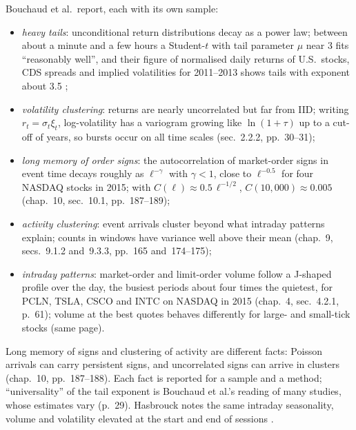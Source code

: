 \begin{qfevidence}\label{ev:high-frequency-stylised-facts}
 Bouchaud et al.\ report, each with its own sample:
\begin{itemize}
\item \emph{heavy tails}: unconditional return distributions decay as a power law; between about a minute and a few hours a Student-$t$ with tail parameter $\mu$ near 3 fits ``reasonably well'', and their figure of normalised daily returns of U.S.\ stocks, CDS spreads and implied volatilities for 2011--2013 shows tails with exponent about 3.5 \citep[chap.~2, sec.~2.2.1, pp.~28--30]{catalogue-0528};
\item \emph{volatility clustering}: returns are nearly uncorrelated but far from IID; writing $r_t=\sigma_t\xi_t$, log-volatility has a variogram growing like $\ln(1+\tau)$ up to a cut-off of years, so bursts occur on all time scales (sec.~2.2.2, pp.~30--31);
\item \emph{long memory of order signs}: the autocorrelation of market-order signs in event time decays roughly as $\ell^{-\gamma}$ with $\gamma<1$, close to $\ell^{-0.5}$ for four NASDAQ stocks in 2015; with $C(\ell)\approx0.5\,\ell^{-1/2}$, $C(10{,}000)\approx0.005$ (chap.~10, sec.~10.1, pp.~187--189);
\item \emph{activity clustering}: event arrivals cluster beyond what intraday patterns explain; counts in windows have variance well above their mean (chap.~9, secs.~9.1.2 and~9.3.3, pp.~165 and~174--175);
\item \emph{intraday patterns}: market-order and limit-order volume follow a J-shaped profile over the day, the busiest periods about four times the quietest, for PCLN, TSLA, CSCO and INTC on NASDAQ in 2015 (chap.~4, sec.~4.2.1, p.~61); volume at the best quotes behaves differently for large- and small-tick stocks (same page).
\end{itemize}

 Long memory of signs and clustering of activity are different facts: Poisson arrivals can carry persistent signs, and uncorrelated signs can arrive in clusters (chap.~10, pp.~187--188). Each fact is reported for a sample and a method; ``universality'' of the tail exponent is Bouchaud et al.'s reading of many studies, whose estimates vary (p.~29). Hasbrouck notes the same intraday seasonality, volume and volatility elevated at the start and end of sessions \citep[note~1 to chap.~4, p.~180]{s6-hasbrouck}.


\end{qfevidence}
